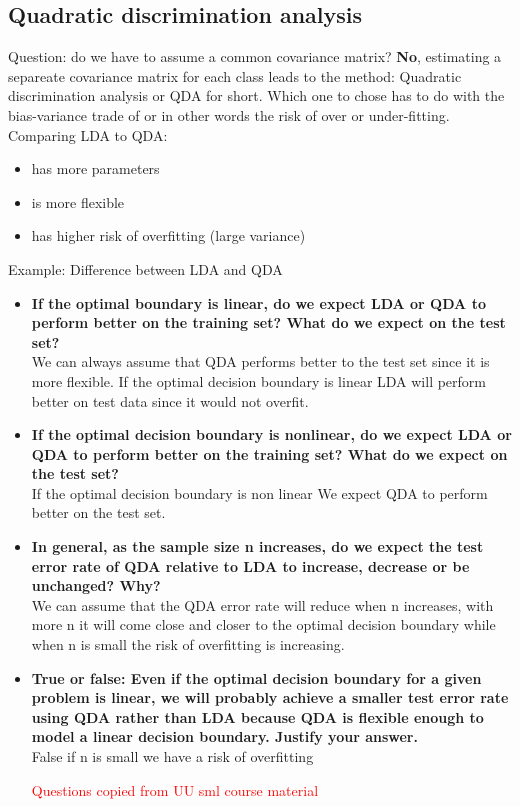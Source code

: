 \subsection{Quadratic discrimination analysis}
Question: do we have to assume a common covariance matrix? \textbf{No}, estimating a separeate covariance matrix for each class leads to the method: Quadratic discrimination analysis or QDA for short. Which one to chose has to do with the bias-variance trade of or in other words the risk of over or under-fitting. Comparing LDA to QDA:

\begin{itemize}
	\item has more parameters
	\item is more flexible
	\item has higher risk of overfitting (large variance)
\end{itemize}


\begin{example}{Example: Difference between LDA and QDA}
\begin{itemize}
	\item \textbf{If the optimal boundary is linear, do we expect LDA or QDA to perform better on the training set? What do we expect on the test set?} \\
	We can always assume that QDA performs better to the test set since it is more flexible. If the optimal decision boundary is linear LDA will perform better on test data since it would not overfit.
	\item \textbf{If the optimal decision boundary is nonlinear, do we expect LDA or QDA to perform better on the training set? What do we expect on the test set?} \\
	If the optimal decision boundary is non linear We expect QDA to perform better on the test set.
	\item \textbf{In general, as the sample size n increases, do we expect the test error rate of QDA relative to LDA to increase, decrease or be unchanged? Why?} \\
	We can assume that the QDA error rate will reduce when n increases, with more n it will come close and closer to the optimal decision boundary while when n is small the risk of overfitting is increasing. 

	\item \textbf{True or false: Even if the optimal decision boundary for a given problem is linear, we will probably achieve a smaller test error rate using QDA rather than LDA because QDA is flexible enough to model a linear decision boundary. Justify your answer.} \\
	False if n is small we have a risk of overfitting

\textcolor{red}{Questions copied from UU sml course material} 
\end{itemize}
\end{example}	

